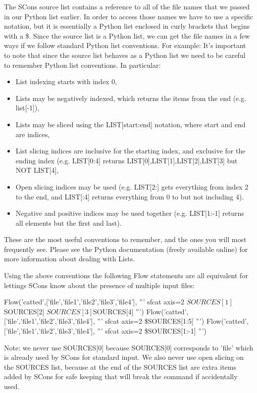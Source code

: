 The SCons source list contains a reference to all of the file names that we passed in our Python list earlier.  In order to access those names we have to use a specific notation, but it is essentially a Python list enclosed in curly brackets that begins with a \$. Since the source list is a Python list, we can get the file names in a few ways if we follow standard Python list conventions.   For example:
It's important to note that since the source list behaves as a Python list we need to be careful to remember Python list conventions.  In particular:
\begin{itemize}
\item List indexing starts with index 0,
\item Lists may be negatively indexed, which returns the items from the end (e.g. list[-1]),
\item Lists may be sliced using the LIST[start:end] notation, where start and end are indices,
\item List slicing indices are inclusive for the starting index, and exclusive for the ending index (e.g. LIST[0:4] returns LIST[0],LIST[1],LIST[2],LIST[3] but NOT LIST[4],
\item Open slicing indices may be used (e.g. LIST[2:] gets everything from index 2 to the end, and LIST[:4] returns everything from 0 to but not including 4).  
\item Negative and positive indices may be used together (e.g. LIST[1:-1] returns all elements but the first and last).
\end{itemize}
These are the most useful conventions to remember, and the ones you will most frequently see.  Please see the Python documentation (freely available online) for more information about dealing with Lists.

Using the above conventions the following Flow statements are all equivalent for lettings SCons know about the presence of multiple input files:
\begin{verbatimtab}[4]
Flow('catted',['file','file1','file2','file3','file4'],
    '''
    sfcat axis=2 ${SOURCES[1]} ${SOURCES[2]} 
    ${SOURCES[3]} ${SOURCES[4]}
    ''')
Flow('catted',['file','file1','file2','file3','file4'],
    '''
    sfcat axis=2 \${SOURCES[1:5]}
    ''')
Flow('catted',['file','file1','file2','file3','file4'],
    '''
    sfcat axis=2 \${SOURCES[1:-1]}
    ''')
\end{verbatimtab}
Note: we never use SOURCES[0] because SOURCES[0] corresponds to 'file' which is already used by SCons for standard input.  We also never use open slicing on the SOURCES list, because at the end of the SOURCES list are extra items added by SCons for safe keeping that will break the command if accidentally used.

